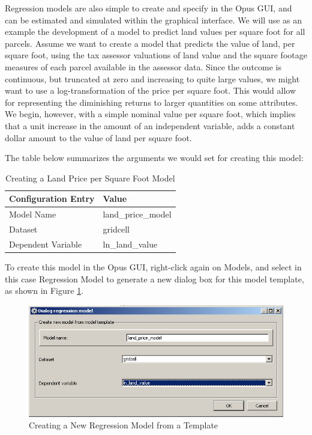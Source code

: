Regression models are also simple to create and specify in the Opus GUI, and can be estimated and simulated within the graphical interface.  We will use as an example the development of a model to predict land values per square foot for all parcels.  Assume we want to create a model that predicts the value of land, per square foot, using the tax assessor valuations of land value and the square footage measures of each parcel available in the assessor data.  Since the outcome is continuous, but truncated at zero and increasing to quite large values, we might want to use a log-transformation of the price per square foot.  This would allow for representing the diminishing returns to larger quantities on some attributes.  We begin, however, with a simple nominal value per square foot, which implies that a unit increase in the amount of an independent variable, adds a constant dollar amount to the value of land per square foot.

The table below summarizes the arguments we would set for creating this model:

\begin{table}[htp]
\caption{Creating a Land Price per Square Foot Model}
\label{tab:land-price-sqft-model}
\begin{center}
\begin{tabular}{ p{1.3in} p{3.0in}  }
\toprule[1.5pt]
Configuration Entry  & Value \\
\midrule
Model Name & land\_price\_model \\
Dataset & gridcell \\
Dependent Variable  &ln\_land\_value   \\
\bottomrule
\end{tabular}
\end{center}
\end{table}

To create this model in the Opus GUI, right-click again on Models, and select in this case Regression Model to generate a new dialog box for this model template, as shown in Figure \ref{fig:create-regression-model}.

\begin{figure}[htp]
\begin{center}
\includegraphics[scale=0.6]{part-gui/images/model-manager-create-regression-model-from-template.png}
\end{center}
\caption{Creating a New Regression Model from a Template}
\label{fig:create-regression-model}
\end{figure}

